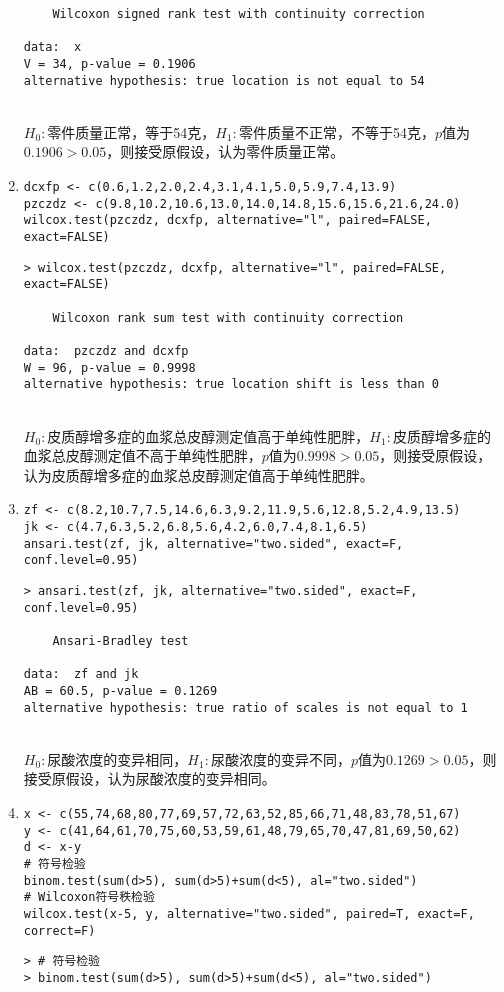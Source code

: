\begin{enumerate}
\begin{lstlisting}
	Wilcoxon signed rank test with continuity correction

data:  x
V = 34, p-value = 0.1906
alternative hypothesis: true location is not equal to 54
\end{lstlisting}
        \summary\\
        $H_0:$零件质量正常，等于54克，$H_1:$零件质量不正常，不等于54克，$p$值为$0.1906>0.05$，则接受原假设，认为零件质量正常。
        \item
        \code
\begin{lstlisting}
dcxfp <- c(0.6,1.2,2.0,2.4,3.1,4.1,5.0,5.9,7.4,13.9)
pzczdz <- c(9.8,10.2,10.6,13.0,14.0,14.8,15.6,15.6,21.6,24.0)
wilcox.test(pzczdz, dcxfp, alternative="l", paired=FALSE, exact=FALSE)
\end{lstlisting}
        \out
\begin{lstlisting}
> wilcox.test(pzczdz, dcxfp, alternative="l", paired=FALSE, exact=FALSE)

	Wilcoxon rank sum test with continuity correction

data:  pzczdz and dcxfp
W = 96, p-value = 0.9998
alternative hypothesis: true location shift is less than 0
\end{lstlisting}
        \summary\\
        $H_0:$皮质醇增多症的血浆总皮醇测定值高于单纯性肥胖，$H_1:$皮质醇增多症的血浆总皮醇测定值不高于单纯性肥胖，$p$值为$0.9998>0.05$，则接受原假设，认为皮质醇增多症的血浆总皮醇测定值高于单纯性肥胖。
        \item
        \code
\begin{lstlisting}
zf <- c(8.2,10.7,7.5,14.6,6.3,9.2,11.9,5.6,12.8,5.2,4.9,13.5)
jk <- c(4.7,6.3,5.2,6.8,5.6,4.2,6.0,7.4,8.1,6.5)
ansari.test(zf, jk, alternative="two.sided", exact=F, conf.level=0.95)
\end{lstlisting}
        \out
\begin{lstlisting}
> ansari.test(zf, jk, alternative="two.sided", exact=F, conf.level=0.95)

	Ansari-Bradley test

data:  zf and jk
AB = 60.5, p-value = 0.1269
alternative hypothesis: true ratio of scales is not equal to 1
\end{lstlisting}
        \summary\\
        $H_0:$尿酸浓度的变异相同，$H_1:$尿酸浓度的变异不同，$p$值为$0.1269>0.05$，则接受原假设，认为尿酸浓度的变异相同。
        \item
        \code
\begin{lstlisting}
x <- c(55,74,68,80,77,69,57,72,63,52,85,66,71,48,83,78,51,67)
y <- c(41,64,61,70,75,60,53,59,61,48,79,65,70,47,81,69,50,62)
d <- x-y
# 符号检验
binom.test(sum(d>5), sum(d>5)+sum(d<5), al="two.sided")
# Wilcoxon符号秩检验
wilcox.test(x-5, y, alternative="two.sided", paired=T, exact=F, correct=F)
\end{lstlisting}
        \out
\begin{lstlisting}
> # 符号检验
> binom.test(sum(d>5), sum(d>5)+sum(d<5), al="two.sided")


\end{lstlisting}
\end{enumerate}

